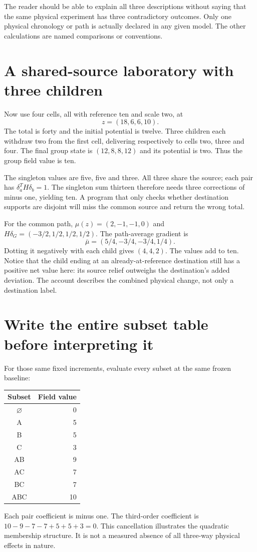 The reader should be able to explain all three descriptions without saying
that the same physical experiment has three contradictory outcomes. Only
one physical chronology or path is actually declared in any given model.
The other calculations are named comparisons or conventions.

\section{A shared-source laboratory with three children}
Now use four cells, all with reference ten and scale two, at
\begin{equation}
 z=(18,6,6,10).
\end{equation}
The total is forty and the initial potential is twelve. Three children
each withdraw two from the first cell, delivering respectively to cells
two, three and four. The final group state is $(12,8,8,12)$ and its
potential is two. Thus the group field value is ten.

The singleton values are five, five and three. All three share the source;
each pair has $\delta_a^TH\delta_b=1$. The singleton sum thirteen
therefore needs three corrections of minus one, yielding ten. A program
that only checks whether destination supports are disjoint will miss the
common source and return the wrong total.

For the common path, $\mu(z)=(2,-1,-1,0)$ and
$H\delta_G=(-3/2,1/2,1/2,1/2)$. The path-average gradient is
\begin{equation}
 \bar\mu=(5/4,-3/4,-3/4,1/4).
\end{equation}
Dotting it negatively with each child gives $(4,4,2)$. The values add
to ten. Notice that the child ending at an already-at-reference destination
still has a positive net value here: its source relief outweighs the
destination's added deviation. The account describes the combined physical
change, not only a destination label.

\section{Write the entire subset table before interpreting it}
For those same fixed increments, evaluate every subset at the same frozen
baseline:
\begin{center}
\begin{tabular}{cr}
\toprule Subset & Field value\\\midrule
$\varnothing$ & 0\\
A & 5\\
B & 5\\
C & 3\\
AB & 9\\
AC & 7\\
BC & 7\\
ABC & 10\\\bottomrule
\end{tabular}
\end{center}
Each pair coefficient is minus one. The third-order coefficient is
$10-9-7-7+5+5+3=0$. This cancellation illustrates the quadratic
membership structure. It is not a measured absence of all three-way
physical effects in nature.

